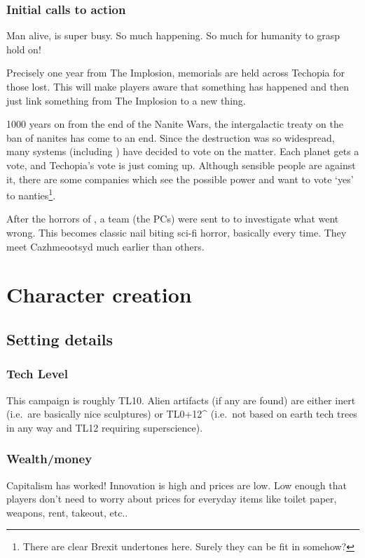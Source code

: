 \subsection{Initial calls to action}
\label{sec:initial-calls-to-action}

Man alive,  is super busy. So much happening. So much for
humanity to grasp hold on!

Precisely one year from The Implosion, memorials are held across Techopia for
those lost. This will make players aware that something has happened and then
just link something from The Implosion to a new thing.

1000 years on from the end of the Nanite Wars, the intergalactic treaty on the
ban of nanites has come to an end. Since the destruction was so widespread, many
systems (including ) have decided to vote on the matter. Each planet
gets a vote, and Techopia's vote is just coming up. Although sensible people are
against it, there are some companies which see the possible power and want to
vote `yes' to nanties\footnote{There are clear Brexit undertones here. Surely
  they can be fit in somehow?}.

After the horrors of , a team (the PCs) were sent to  to
investigate what went wrong. This becomes classic nail biting sci-fi horror,
basically every time. They meet Cazhmeootsyd much earlier than others.



\chapter{Character creation}
\label{cha:character-creation}

\section{Setting details}
\label{sec:setting-details}

\subsection{Tech Level}
\label{sec:tech-level}

This campaign is roughly TL10. Alien artifacts (if any are found) are either
inert (i.e.~are basically nice sculptures) or TL0+12\^{} (i.e.~not based on
earth tech trees in any way and TL12 requiring superscience).

\subsection{Wealth/money}
Capitalism has worked! Innovation is high and prices are low. Low enough that 
players don't need to worry about prices for everyday items like toilet paper,
weapons, rent, takeout, etc..

